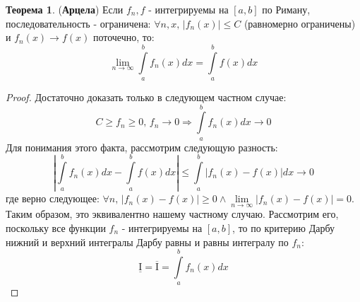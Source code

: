 \documentclass[12pt]{article}
\newcommand{\MI}{\mathrm{I}}
\theoremstyle{definition}
\newtheorem{theorem}{Теорема}
\newcommand{\ddint}[2]{\displaystyle\int\limits_{#1}^{#2}}
\begin{document}
\begin{theorem}(\textbf{Арцела})
	Если $f_n, f$ - интегрируемы на $[a,b]$ по Риману, последовательность - ограничена: $\forall n, x, \, |f_n(x)| \leq C$ (равномерно ограничены) и $f_n(x) \to f(x)$ поточечно, то:
	$$
		\lim\limits_{n \to \infty} \ddint{a}{b}f_n(x) dx = \ddint{a}{b}f(x)dx
	$$
\end{theorem}
\begin{proof}
	Достаточно доказать только в следующем частном случае:
	$$
		C \geq f_n \geq 0, \, f_n \to 0 \Rightarrow \ddint{a}{b}f_n(x)dx \to 0
	$$
	Для понимания этого факта, рассмотрим следующую разность:
	$$
		\left|\ddint{a}{b}f_n(x)dx - \ddint{a}{b}f(x)dx\right| \leq \ddint{a}{b}\left|f_n(x) - f(x)\right|dx \to 0 
	$$
	где верно следующее: $\forall n, \, |f_n(x) - f(x) | \geq 0 \wedge \lim\limits_{n \to \infty}|f_n(x) - f(x)| = 0$. Таким образом, это эквивалентно нашему частному случаю. Рассмотрим его, поскольку все функции $f_n$ - интегрируемы на $[a,b]$, то по критерию Дарбу нижний и верхний интегралы Дарбу равны и равны интегралу по $f_n$:
	$$
		\underline{\MI} = \overline{\MI} = \int\limits_{a}^{b}f_n(x) dx
	$$
	

\end{proof}
\end{document}
